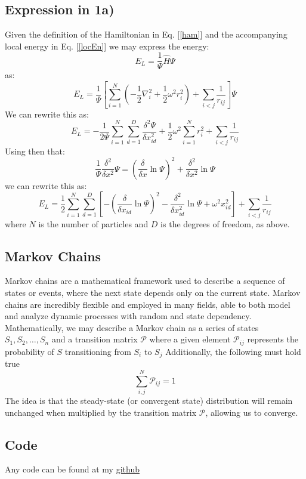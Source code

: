 \documentclass{article}
\begin{document}
\subsection{Expression in 1a)} \label{AppEn}
Given the definition of the Hamiltonian in Eq. [\ref{ham}] and the accompanying local energy in Eq. [\ref{locEn}] we may express the energy:
\begin{equation*}
    E_L = \frac{1}{\Psi} \hat H \Psi
\end{equation*}
as:
\begin{equation*}
    E_L = \frac{1}{\Psi} \left[ \sum_{i=1}^N \left( -\frac{1}{2} \nabla_i^2 + \frac{1}{2} \omega^2 r^2_i \right) + \sum_{i<j} \frac{1}{r_{ij}}\right] \Psi
\end{equation*}
We can rewrite this as:
\begin{equation*}
    E_L = -\frac{1}{2\Psi} \sum_{i=1}^N \sum_{d=1}^D \frac{\delta^2 \Psi}{\delta x_{id}^2} + \frac{1}{2}\omega^2 \sum_{i=1}^N r_i^2 + \sum_{i<j} \frac{1}{r_{ij}}
\end{equation*}
Using then that:
\begin{equation*}
    \frac{1}{\Psi} \frac{\delta^2}{\delta x^2} \Psi = \left(\frac{\delta}{\delta x} \ln \Psi \right)^2 + \frac{\delta^2}{\delta x^2} \ln \Psi
\end{equation*}
we can rewrite this as:
\begin{equation}
    E_L = \frac{1}{2} \sum_{i=1}^N \sum_{d=1}^D \left[-\left(\frac{\delta}{\delta x_{id}} \ln \Psi \right)^2 - \frac{\delta^2}{\delta x_{id}^2} \ln \Psi + \omega^2 x_{id}^2 \right] + \sum_{i<j} \frac{1}{r_{ij}}
\end{equation}
where $N$ is the number of particles and $D$ is the degrees of freedom, as above.
\subsection{Markov Chains} \label{AppMa}
Markov chains are a mathematical framework used to describe a sequence of states or events, where the next state depends only on the current state. Markov chains are incredibly flexible and employed in many fields, able to both model and analyze dynamic processes with random and state dependency.
\newline
Mathematically, we may describe a Markov chain as a series of states ${S_1, S_2, \ldots, S_n}$ and a transition matrix $\mathcal{P}$ where a given element $\mathcal{P}_{ij}$ represents the probability of $S$ transitioning from $S_i$ to $S_j$
\newline
Additionally, the following must hold true
\begin{equation*}
    \sum_{i,j}^N \mathcal{P}_{ij} = 1
\end{equation*}
The idea is that the steady-state (or convergent state) distribution will remain unchanged when multiplied by the transition matrix $\mathcal{P}$, allowing us to converge.
\subsection{Code}
Any code can be found at my \href{https://github.com/simloken/FYS4411/tree/main/Project_2}{github}
\end{document}
